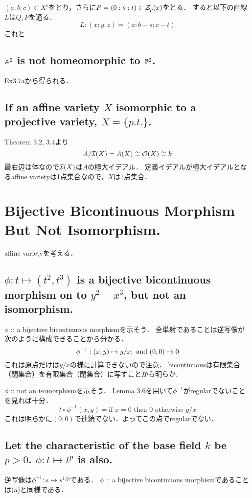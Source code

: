 \documentclass[a4paper]{jsarticle}
\begin{document}
    $(a:b:c) \in X^c$をとり，さらに$P=(0:s:t) \in \mathcal{Z}_p(x)$をとる．
    すると以下の直線$L$は$Q,P$を通る．
    \[ L: (x:y:z)=(a:b-s:c-t) \]
    これと

    \subsection{$\mathbb{A}^2$ is not homeomorphic to $\mathbb{P}^2$.}
    Ex3.7aから得られる．

    \subsection{If an affine variety $X$ isomorphic to a projective variety, $X=\{p.t.\}$.}
    Theorem 3.2, 3.4より
    \[ A/\mathcal{I}(X)=A(X) \cong \mathcal{O}(X) \cong k \]
    最右辺は体なので$\mathcal{I}(X)$は$A$の極大イデアル．
    定義イデアルが極大イデアルとなるaffine varietyは1点集合なので，$X$は1点集合．

\section{Bijective Bicontinuous Morphism But Not Isomorphism.} %
    affine varietyを考える．
    \subsection{$\phi: t \mapsto (t^2,t^3)$ is a bijective bicontinuous morphism on to $y^2=x^3$, but not an isomorphism.}
    $\phi$ :: a bijective bicontinuous morphismを示そう．
    全単射であることは逆写像が次のように構成できることから分かる．
    \[ \phi^{-1}: (x,y) \mapsto y/x; \text{ and } (0,0) \mapsto 0 \]
    これは原点だけは$y/x$の様に計算できないので注意．
    bicontinuousは有限集合（閉集合）を有限集合（閉集合）に写すことから明らか．

    $\phi$ :: not an isomorphismを示そう．
    Lemma 3.6を用いて$\phi^{-1}$がregularでないことを見れば十分．
    \[ t \circ \phi^{-1}(x,y)=\mbox{if $x=0$ then $0$ otherwise $y/x$} \]
    これは明らかに$(0,0)$で連続でない．よってこの点でregularでない．

    \subsection{Let the characteristic of the base field $k$ be $p > 0$. $\phi: t \mapsto t^p$ is also.}
    逆写像は$\phi^{-1}: s \mapsto s^{1/p}$である．
    $\phi$ :: a bijective bicontinuous morphismであることは(a)と同様である．
\end{document}
